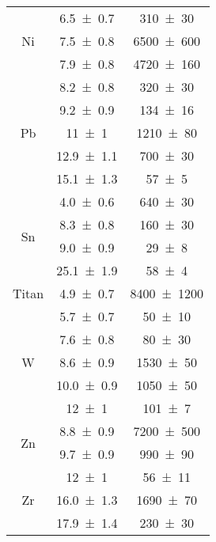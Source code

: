 \begin{table}[H]
\begin{tabular}{c|c|c}
\multirow{3}{*}{Ni} & \num{6.5\pm 0.7} & \num{310\pm 30} \\ & \num{7.5\pm 0.8} & \num{6500\pm 600} \\ & \num{7.9\pm 0.8} & \num{4720\pm 160} \\\hline
\multirow{5}{*}{Pb} & \num{8.2\pm 0.8} & \num{320\pm 30} \\ & \num{9.2\pm 0.9} & \num{134\pm 16} \\ & \num{11\pm 1} & \num{1210\pm 80} \\ & \num{12.9\pm 1.1} & \num{700\pm 30} \\ & \num{15.1\pm 1.3} & \num{57\pm 5} \\\hline
\multirow{4}{*}{Sn} & \num{4.0\pm 0.6} & \num{640\pm 30} \\ & \num{8.3\pm 0.8} & \num{160\pm 30} \\ & \num{9.0\pm 0.9} & \num{29\pm 8} \\ & \num{25.1\pm 1.9} & \num{58\pm 4} \\\hline
\multirow{1}{*}{Titan} & \num{4.9\pm 0.7} & \num{8400\pm 1200} \\\hline
\multirow{5}{*}{W} & \num{5.7\pm 0.7} & \num{50\pm 10} \\ & \num{7.6\pm 0.8} & \num{80\pm 30} \\ & \num{8.6\pm 0.9} & \num{1530\pm 50} \\ & \num{10.0\pm 0.9} & \num{1050\pm 50} \\ & \num{12\pm 1} & \num{101\pm 7} \\\hline
\multirow{2}{*}{Zn} & \num{8.8\pm 0.9} & \num{7200\pm 500} \\ & \num{9.7\pm 0.9} & \num{990\pm 90} \\\hline
\multirow{3}{*}{Zr} & \num{12\pm 1} & \num{56\pm 11} \\ & \num{16.0\pm 1.3} & \num{1690\pm 70} \\ & \num{17.9\pm 1.4} & \num{230\pm 30} \\\hline

    \end{tabular}
\end{table}